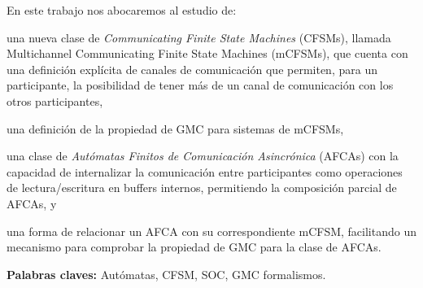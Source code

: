 En este trabajo nos abocaremos al estudio de: 
\begin{inparaenum}[1)] 
\item una nueva clase de \emph{Communicating Finite State Machines} (CFSMs), llamada Multichannel Communicating Finite State Machines (mCFSMs), que cuenta con una definición explícita de canales de comunicación que permiten, para un participante, la posibilidad de tener más de un canal de comunicación con los otros participantes, 
\item una definición de la propiedad de GMC para sistemas de mCFSMs,
\item una clase de \emph{Autómatas Finitos de Comunicación Asincrónica} (AFCAs) con la capacidad de internalizar la comunicación entre participantes como operaciones de lectura/escritura en buffers internos, permitiendo la composición parcial de AFCAs, y
\item una forma de relacionar un AFCA con su correspondiente mCFSM, facilitando un mecanismo para comprobar la propiedad de GMC para la clase de AFCAs.
\end{inparaenum}

\bigskip

\noindent\textbf{Palabras claves:} Autómatas, CFSM, SOC, GMC formalismos.